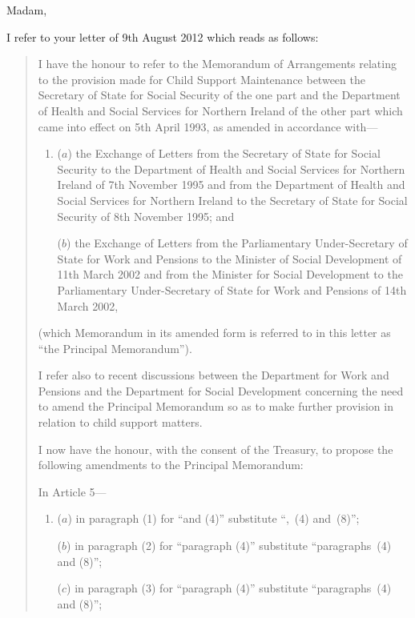 \documentclass[12pt,a4paper]{article}
\begin{document}
Madam,

I refer to your letter of 9th August 2012 which reads as follows:
\begin{quotation}
I have the honour to refer to the Memorandum of Arrangements relating to the 
provision made for Child Support Maintenance between the Secretary of State for
Social Security of the one part and the Department of Health and Social Services for
Northern Ireland of the other part which came into effect on 5th April 1993, as
amended in accordance with---
\begin{enumerate}\item[]
($a$) the Exchange of Letters from the Secretary of State for Social Security to the Department of Health and Social Services for Northern Ireland of 7th November 1995 and from the Department of Health and Social Services for Northern Ireland to the Secretary of State for Social Security of 8th November 1995; and

($b$) the Exchange of Letters from the Parliamentary Under-Secretary of State for Work and Pensions to the Minister of Social Development of 11th March 2002 and from the Minister for Social Development to the Parliamentary Under-Secretary of State for Work and Pensions of 14th March 2002,
\end{enumerate}
(which Memorandum in its amended form is referred to in this letter as ``the Principal Memorandum'').

I refer also to recent discussions between the Department for Work and Pensions and the Department for Social Development concerning the need to amend the Principal Memorandum so as to make further provision in relation to child support matters.

I now have the honour, with the consent of the Treasury, to propose the following amendments to the Principal Memorandum:

In Article 5---
\begin{enumerate}\item[]
($a$) in paragraph (1) for ``and (4)'' substitute ``,~(4) and~(8)'';

\begin{sloppypar}
($b$) in paragraph (2) for ``paragraph (4)'' substitute ``paragraphs~(4) and (8)'';
\end{sloppypar}

\begin{sloppypar}
($c$) in paragraph (3) for ``paragraph (4)'' substitute ``paragraphs~(4) and (8)'';
\end{sloppypar}


\end{enumerate}
\end{quotation}
\end{document}
